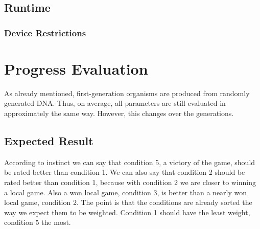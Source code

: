 \subsection{ Runtime } 

\subsubsection{ Device Restrictions}


\section{Progress Evaluation}
As already mentioned, first-generation organisms are produced from randomly generated DNA. Thus, on average, all parameters are still evaluated in approximately the same way. However, this changes over the generations.

\subsection{Expected Result}
According to instinct we can say that condition 5, a victory of the game, should be rated better than condition 1. We can also say that condition 2 should be rated better than condition 1, because with condition 2 we are closer to winning a local game. Also a won local game, condition 3, is better than a nearly won local game, condition 2.
The point is that the conditions are already sorted the way we expect them to be weighted. Condition 1 should have the least weight, condition 5 the most.

